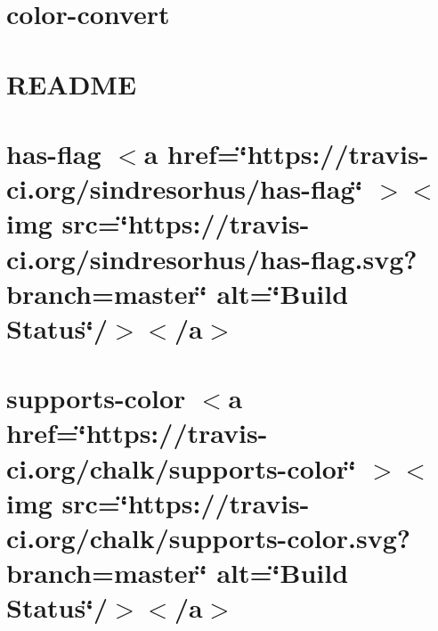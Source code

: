 \documentclass[twoside]{book}
\newcommand{\+}{\discretionary{\mbox{\scriptsize$\hookleftarrow$}}{}{}}
\begin{document}
\chapter{color-\/convert}
\label{md__c___users_vaishnavi_jadhav__desktop__developer_code_mean_stack_example_client_node_modules_cec98920d1a74446c79539aee10ebbe75}

\chapter{README}
\label{md__c___users_vaishnavi_jadhav__desktop__developer_code_mean_stack_example_client_node_modules_c2b5bb15fb8296b05e41310507d68c2c8}

\chapter{has-\/flag \texorpdfstring{$<$}{<}a href=\char`\"{}https\+://travis-\/ci.\+org/sindresorhus/has-\/flag\char`\"{} \texorpdfstring{$>$}{>}\texorpdfstring{$<$}{<}img src=\char`\"{}https\+://travis-\/ci.\+org/sindresorhus/has-\/flag.\+svg?branch=master\char`\"{} alt=\char`\"{}\+Build Status\char`\"{}/\texorpdfstring{$>$}{>}\texorpdfstring{$<$}{<}/a\texorpdfstring{$>$}{>}}
\label{md__c___users_vaishnavi_jadhav__desktop__developer_code_mean_stack_example_client_node_modules_c43ee420a6bbc0862ac88ae32e585e5c3}

\chapter{supports-\/color \texorpdfstring{$<$}{<}a href=\char`\"{}https\+://travis-\/ci.\+org/chalk/supports-\/color\char`\"{} \texorpdfstring{$>$}{>}\texorpdfstring{$<$}{<}img src=\char`\"{}https\+://travis-\/ci.\+org/chalk/supports-\/color.\+svg?branch=master\char`\"{} alt=\char`\"{}\+Build Status\char`\"{}/\texorpdfstring{$>$}{>}\texorpdfstring{$<$}{<}/a\texorpdfstring{$>$}{>}}
\label{md__c___users_vaishnavi_jadhav__desktop__developer_code_mean_stack_example_client_node_modules_cfae4988a63b514bfacf22524d7823747}

\end{document}
